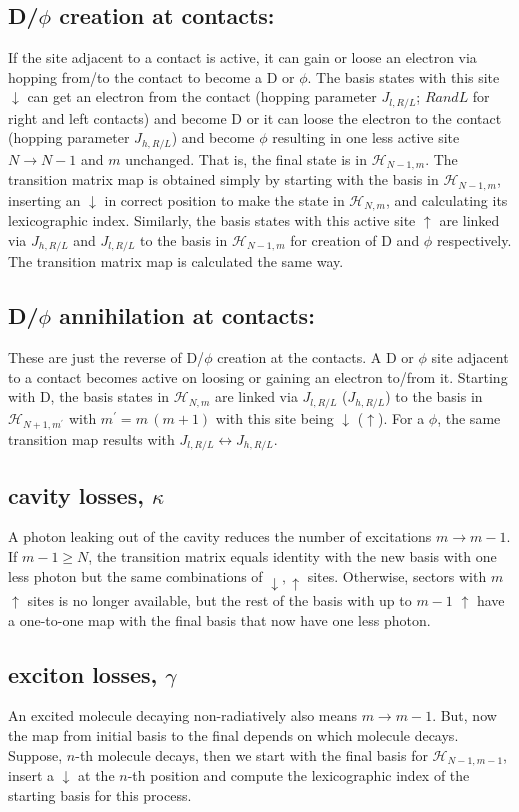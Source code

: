 \documentclass[a4paper,twocolumn]{revtex4-1} %
\newcommand{\da}{\downarrow}
\newcommand{\ua}{\uparrow}
\begin{document}
\subsection{ D/$\phi$ creation at contacts: }
If the site adjacent to a contact is active, 
it can gain or loose an electron via hopping from/to the contact to become a D or $\phi$.
The basis states with this site $\da$ 
can get an electron from the contact (hopping parameter $J_{l,R/L}$; $R and L$ for right and left contacts)
and become D or it can loose the electron to the contact (hopping parameter $J_{h,R/L}$)
and become $\phi$
resulting in one less active site $N\rightarrow N-1$ and $m$ unchanged.
That is, the final state is in $\mathcal{H}_{N-1,m}$. 
The transition matrix map is obtained simply by starting with the basis in $\mathcal{H}_{N-1,m}$,
inserting an $\da$ in correct position to make the state in $\mathcal{H}_{N,m}$,
and calculating its lexicographic index.
Similarly, the basis states with this active site $\ua$ 
are linked via $J_{h,R/L}$ and $J_{l,R/L}$ to 
the basis in $\mathcal{H}_{N-1,m}$
for creation of D and $\phi$ respectively.
The transition matrix map is calculated the same way.


\subsection{ D/$\phi$ annihilation at contacts: }
These are just the reverse of D/$\phi$ creation at the contacts.
A D or $\phi$ site adjacent to a contact becomes active on loosing or gaining an electron to/from it.
Starting with D, 
the basis states in $\mathcal{H}_{N,m}$
are linked via $J_{l,R/L}$ ($J_{h,R/L}$) to 
the basis in $\mathcal{H}_{N+1,m^\prime}$ with $m^\prime=m\,(m+1)$
with this site being $\da$ ($\ua$).
For a $\phi$, 
the same transition map results with $J_{l,R/L} \leftrightarrow J_{h,R/L} $.

\subsection{cavity losses, $\kappa$}
A photon leaking out of the cavity reduces the number of excitations $m \rightarrow m-1$.
If $m-1 \geq N$, the transition matrix equals identity with the new basis with one less photon but the same combinations of $\da,\ua$ sites.
Otherwise, sectors with $m$ $\ua$ sites is no longer available, but
the rest of the basis with up to $m-1$ $\ua$ 
have a one-to-one map with the final basis that now have one less photon.

\subsection{exciton losses, $\gamma$}
An excited molecule decaying non-radiatively also means $m \rightarrow m-1$.
But, now the map from initial basis to the final depends on which molecule decays.
Suppose, $n$-th molecule decays, then we start with the final basis for 
$\mathcal{H}_{N-1,m-1}$,
insert a $\da$ at the $n$-th position and compute 
the lexicographic index of the starting basis for this process.
\end{document}

